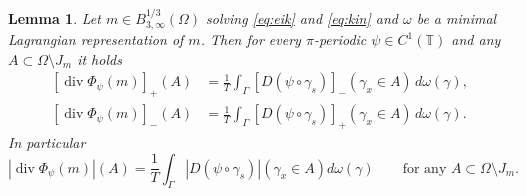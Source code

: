 \documentclass[fleqn
]{article}
\numberwithin{equation}{section}
\newcommand{\T}{{\mathbb T}}
\DeclareMathOperator{\dv}{div}
\newtheorem{lem}[thm]{Lemma}
\theoremstyle{definition}
\begin{document}
\begin{lem}\label{l:abs_no_jumps}
Let $m \in B^{1/3}_{3,\infty}(\Omega)$ solving \eqref{eq:eik} and \eqref{eq:kin} and $\omega$ be a minimal Lagrangian representation of $m$.
Then for every $\pi$-periodic $\psi \in C^1(\T)$  and any $A \subset \Omega \setminus J_m$ it holds
\[
\begin{split}
[\dv \Phi_\psi (m)]_+ (A) & = \frac1T \int_\Gamma [D(\psi \circ \gamma_s)]_- (\gamma_x \in A) \, d\omega (\gamma),\\
[\dv \Phi_\psi (m)]_- (A) & = \frac1T \int_\Gamma [D(\psi \circ \gamma_s)]_+ (\gamma_x \in A) \, d\omega (\gamma).
\end{split}
\]
In particular
\[
|\dv \Phi_\psi (m)| (A) = \frac1T \int_\Gamma |D(\psi \circ \gamma_s)| (\gamma_x \in A) d\omega (\gamma) \qquad \mbox{for any } A \subset \Omega \setminus J_m.
\]
\end{lem}
%
\end{document}
